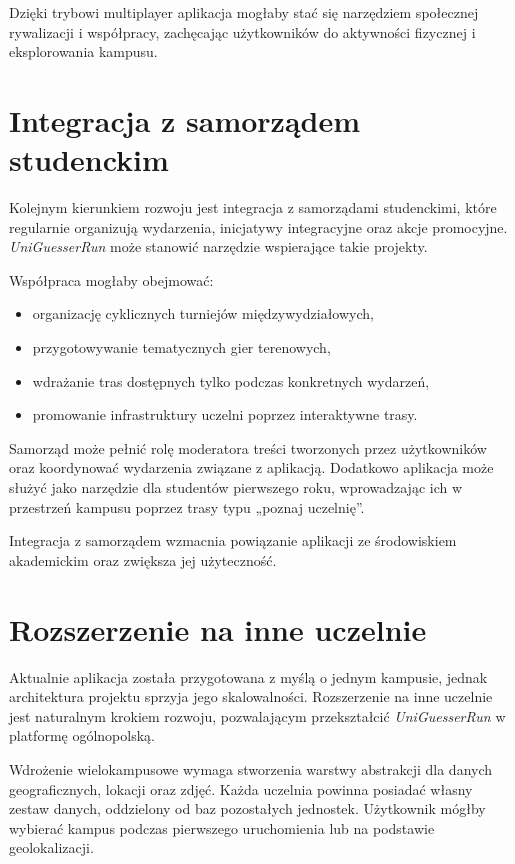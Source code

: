 Dzięki trybowi multiplayer aplikacja mogłaby stać się narzędziem społecznej rywalizacji i współpracy, zachęcając użytkowników do aktywności fizycznej i eksplorowania kampusu.

\section{Integracja z samorządem studenckim}

Kolejnym kierunkiem rozwoju jest integracja z samorządami studenckimi, które regularnie organizują wydarzenia, inicjatywy integracyjne oraz akcje promocyjne. \textit{UniGuesserRun} może stanowić narzędzie wspierające takie projekty.

Współpraca mogłaby obejmować:
\begin{itemize}
    \item organizację cyklicznych turniejów międzywydziałowych,
    \item przygotowywanie tematycznych gier terenowych,
    \item wdrażanie tras dostępnych tylko podczas konkretnych wydarzeń,
    \item promowanie infrastruktury uczelni poprzez interaktywne trasy.
\end{itemize}

Samorząd może pełnić rolę moderatora treści tworzonych przez użytkowników oraz koordynować wydarzenia związane z aplikacją. Dodatkowo aplikacja może służyć jako narzędzie dla studentów pierwszego roku, wprowadzając ich w przestrzeń kampusu poprzez trasy typu „poznaj uczelnię”.

Integracja z samorządem wzmacnia powiązanie aplikacji ze środowiskiem akademickim oraz zwiększa jej użyteczność.

\section{Rozszerzenie na inne uczelnie}

Aktualnie aplikacja została przygotowana z myślą o jednym kampusie, jednak architektura projektu sprzyja jego skalowalności. Rozszerzenie na inne uczelnie jest naturalnym krokiem rozwoju, pozwalającym przekształcić \textit{UniGuesserRun} w platformę ogólnopolską.

Wdrożenie wielokampusowe wymaga stworzenia warstwy abstrakcji dla danych geograficznych, lokacji oraz zdjęć. Każda uczelnia powinna posiadać własny zestaw danych, oddzielony od baz pozostałych jednostek. Użytkownik mógłby wybierać kampus podczas pierwszego uruchomienia lub na podstawie geolokalizacji.

